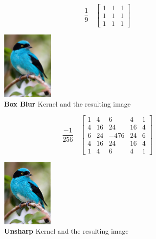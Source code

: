 \FloatBarrier
\begin{figure}[ht]
\begin{minipage}[b]{0.5\linewidth}
\centering
    $$
    \frac{1}{9}
    \quad
    \begin{bmatrix} 
    1 & 1 & 1 \\
    1 & 1 & 1 \\
    1 & 1 & 1
    \end{bmatrix}
    $$
\caption{\textbf{Box Blur} Kernel and the resulting image}
\end{minipage}
\begin{minipage}[b]{0.3\linewidth}
\centering
\includegraphics[width=1in]{graphics/convolution/Convolution_gebs_KernelBoxBlur.png}
\end{minipage}
\label{fig:Box Blur Kernel}
\end{figure}
\FloatBarrier
\begin{figure}[ht]
\begin{minipage}[b]{0.5\linewidth}
\centering
    $$
    \frac{-1}{256}
    \quad
    \begin{bmatrix} 
    1 & 4 & 6 & 4 & 1 \\
    4 & 16 & 24 & 16 & 4 \\
    6 & 24 & -476 & 24 & 6 \\
    4 & 16 & 24 & 16 & 4 \\
    1 & 4 & 6 & 4 & 1
    \end{bmatrix}
    $$
\caption{\textbf{Unsharp} Kernel and the resulting image}
\end{minipage}
\begin{minipage}[b]{0.3\linewidth}
\centering
\includegraphics[width=1in]{graphics/convolution/Convolution_gebs_KernelUnsharp5x5.png}
\end{minipage}
\label{fig:Unsharp Kernel}
\end{figure}
